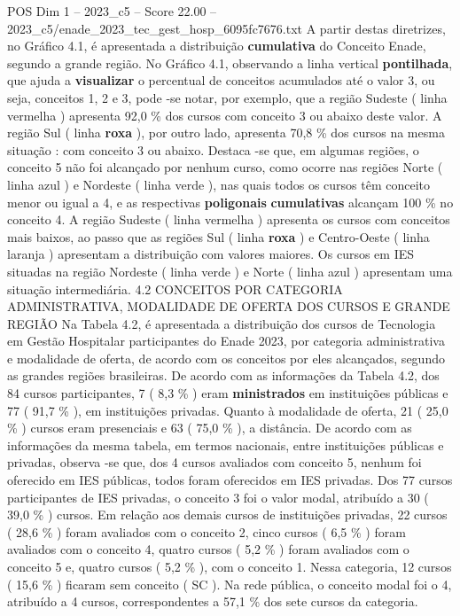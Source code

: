 \begin{textsample}{POS Dim 1 – 2023\_c5 – Score 22.00 – 2023\_c5/enade\_2023\_tec\_gest\_hosp\_6095fc7676.txt}
A partir destas diretrizes, no Gráfico 4.1, é apresentada a distribuição \textbf{cumulativa} do Conceito Enade, segundo a grande região.
No Gráfico 4.1, observando a linha vertical \textbf{pontilhada}, que ajuda a \textbf{visualizar} o percentual de conceitos acumulados até o valor 3, ou seja, conceitos 1, 2 e 3, pode -se notar, por exemplo, que a região Sudeste ( linha vermelha ) apresenta 92,0 \% dos cursos com conceito 3 ou abaixo deste valor.
A região Sul ( linha \textbf{roxa} ), por outro lado, apresenta 70,8 \% dos cursos na mesma situação : com conceito 3 ou abaixo.
Destaca -se que, em algumas regiões, o conceito 5 não foi alcançado por nenhum curso, como ocorre nas regiões Norte ( linha azul ) e Nordeste ( linha verde ), nas quais todos os cursos têm conceito menor ou igual a 4, e as respectivas \textbf{poligonais} \textbf{cumulativas} alcançam 100 \% no conceito 4.
A região Sudeste ( linha vermelha ) apresenta os cursos com conceitos mais baixos, ao passo que as regiões Sul ( linha \textbf{roxa} ) e Centro-Oeste ( linha laranja ) apresentam a distribuição com valores maiores.
Os cursos em IES situadas na região Nordeste ( linha verde ) e Norte ( linha azul ) apresentam uma situação intermediária. 4.2 CONCEITOS POR CATEGORIA ADMINISTRATIVA, MODALIDADE DE OFERTA DOS CURSOS E GRANDE REGIÃO Na Tabela 4.2, é apresentada a distribuição dos cursos de Tecnologia em Gestão Hospitalar participantes do Enade 2023, por categoria administrativa e modalidade de oferta, de acordo com os conceitos por eles alcançados, segundo as grandes regiões brasileiras.
De acordo com as informações da Tabela 4.2, dos 84 cursos participantes, 7 ( 8,3 \% ) eram \textbf{ministrados} em instituições públicas e 77 ( 91,7 \% ), em instituições privadas.
Quanto à modalidade de oferta, 21 ( 25,0 \% ) cursos eram presenciais e 63 ( 75,0 \% ), a distância.
De acordo com as informações da mesma tabela, em termos nacionais, entre instituições públicas e privadas, observa -se que, dos 4 cursos avaliados com conceito 5, nenhum foi oferecido em IES públicas, todos foram oferecidos em IES privadas.
Dos 77 cursos participantes de IES privadas, o conceito 3 foi o valor modal, atribuído a 30 ( 39,0 \% ) cursos.
Em relação aos demais cursos de instituições privadas, 22 cursos ( 28,6 \% ) foram avaliados com o conceito 2, cinco cursos ( 6,5 \% ) foram avaliados com o conceito 4, quatro cursos ( 5,2 \% ) foram avaliados com o conceito 5 e, quatro cursos ( 5,2 \% ), com o conceito 1.
Nessa categoria, 12 cursos ( 15,6 \% ) ficaram sem conceito ( SC ).
Na rede pública, o conceito modal foi o 4, atribuído a 4 cursos, correspondentes a 57,1 \% dos sete cursos da categoria.

\end{textsample}
